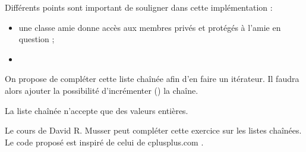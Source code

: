 \documentclass[conference]{IEEEtran}
\begin{document}


Différents points sont important de souligner dans cette implémentation :
\begin{itemize}
    \item une classe amie  donne accès aux membres privés et protégés à l'amie en question ;
    \item
\end{itemize}

On propose de compléter cette liste chaînée afin d'en faire un itérateur. Il faudra alors ajouter la possibilité d'incrémenter () la chaîne.



La liste chaînée n'accepte que des valeurs entières.



Le cours de David R. Musser \cite{coursLC}  peut compléter cette exercice sur les listes chaînées. Le code proposé est inspiré de celui de cplusplus.com \cite{cplusplus.com}.

\end{document}
